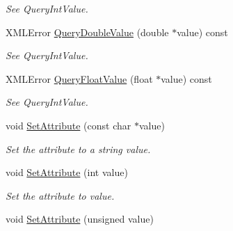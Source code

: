 \begin{DoxyCompactItemize}
\begin{DoxyCompactList}\small\item\em See Query\+Int\+Value. \end{DoxyCompactList}\item 
\hypertarget{classtinyxml2_1_1_x_m_l_attribute_a0872c05edea2a7cde4bd96c1e9cb2fc4}{}X\+M\+L\+Error \hyperlink{classtinyxml2_1_1_x_m_l_attribute_a0872c05edea2a7cde4bd96c1e9cb2fc4}{Query\+Double\+Value} (double $\ast$value) const \label{classtinyxml2_1_1_x_m_l_attribute_a0872c05edea2a7cde4bd96c1e9cb2fc4}

\begin{DoxyCompactList}\small\item\em See Query\+Int\+Value. \end{DoxyCompactList}\item 
\hypertarget{classtinyxml2_1_1_x_m_l_attribute_afb254627c296d1d70b755397d32fece8}{}X\+M\+L\+Error \hyperlink{classtinyxml2_1_1_x_m_l_attribute_afb254627c296d1d70b755397d32fece8}{Query\+Float\+Value} (float $\ast$value) const \label{classtinyxml2_1_1_x_m_l_attribute_afb254627c296d1d70b755397d32fece8}

\begin{DoxyCompactList}\small\item\em See Query\+Int\+Value. \end{DoxyCompactList}\item 
\hypertarget{classtinyxml2_1_1_x_m_l_attribute_a406d2c4a13c7af99a65edb59dd9f7581}{}void \hyperlink{classtinyxml2_1_1_x_m_l_attribute_a406d2c4a13c7af99a65edb59dd9f7581}{Set\+Attribute} (const char $\ast$value)\label{classtinyxml2_1_1_x_m_l_attribute_a406d2c4a13c7af99a65edb59dd9f7581}

\begin{DoxyCompactList}\small\item\em Set the attribute to a string value. \end{DoxyCompactList}\item 
\hypertarget{classtinyxml2_1_1_x_m_l_attribute_ad86d7d7058d76761c3a80662566a57e5}{}void \hyperlink{classtinyxml2_1_1_x_m_l_attribute_ad86d7d7058d76761c3a80662566a57e5}{Set\+Attribute} (int value)\label{classtinyxml2_1_1_x_m_l_attribute_ad86d7d7058d76761c3a80662566a57e5}

\begin{DoxyCompactList}\small\item\em Set the attribute to value. \end{DoxyCompactList}\item 
\hypertarget{classtinyxml2_1_1_x_m_l_attribute_ae70468c0f6df2748ba3529c716999fae}{}void \hyperlink{classtinyxml2_1_1_x_m_l_attribute_ae70468c0f6df2748ba3529c716999fae}{Set\+Attribute} (unsigned value)\label{classtinyxml2_1_1_x_m_l_attribute_ae70468c0f6df2748ba3529c716999fae}


\end{DoxyCompactItemize}
